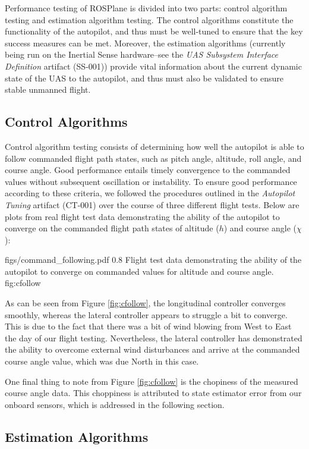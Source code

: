\documentclass[]{auvsi_doc}
\begin{document}
Performance testing of ROSPlane is divided into two parts: control algorithm testing and estimation algorithm testing. The control algorithms constitute the functionality of the autopilot, and thus must be well-tuned to ensure that the key success measures can be met. Moreover, the estimation algorithms (currently being run on the Inertial Sense hardware--see the \textit{UAS Subsystem Interface Definition} artifact (SS-001)) provide vital information about the current dynamic state of the UAS to the autopilot, and thus must also be validated to ensure stable unmanned flight.

\subsection{Control Algorithms}

Control algorithm testing consists of determining how well the autopilot is able to follow commanded flight path states, such as pitch angle, altitude, roll angle, and course angle. Good performance entails timely convergence to the commanded values without subsequent oscillation or instability. To ensure good performance according to these criteria, we followed the procedures outlined in the \textit{Autopilot Tuning} artifact (CT-001) over the course of three different flight tests. Below are plots from real flight test data demonstrating the ability of the autopilot to converge on the commanded flight path states of altitude ($h$) and course angle ($\chi$):

\AUVSIFigure
{figs/command_following.pdf}
{0.8\textwidth}
{Flight test data demonstrating the ability of the autopilot to converge on commanded values for altitude and course angle.}
{fig:cfollow}

As can be seen from Figure \ref{fig:cfollow}, the longitudinal controller converges smoothly, whereas the lateral controller appears to struggle a bit to converge. This is due to the fact that there was a bit of wind blowing from West to East the day of our flight testing. Nevertheless, the lateral controller has demonstrated the ability to overcome external wind disturbances and arrive at the commanded course angle value, which was due North in this case.

One final thing to note from Figure \ref{fig:cfollow} is the chopiness of the measured course angle data. This choppiness is attributed to state estimator error from our onboard sensors, which is addressed in the following section.

\subsection{Estimation Algorithms}
\end{document}
